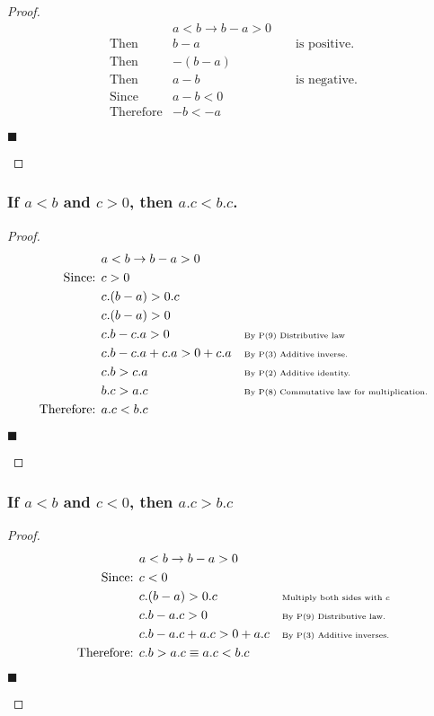 \documentclass[letterpaper, 10 pt, conference]{ieeeconf}  %
\begin{document}
\begin{proof}
\begin{align}
    &a < b \rightarrow b - a > 0 &&\\
    \text{Then } &b - a &&\text{ is positive.} \\
    \text{Then } &-(b - a) &&\\
    \text{Then } &a - b&& \text{ is negative.} \\
    \text{Since } & a - b < 0 && \\
    \text{Therefore} & -b < -a &&
\end{align}
\begin{flushright}
$\blacksquare$
\end{flushright}
\end{proof}

\subsubsection{\textbf{If $a < b$ and $c > 0$, then $a.c < b.c$.}}
\begin{proof}
\begin{align}
    &a < b \rightarrow b - a > 0 &&\\
    \text{Since: } & c > 0 && \\
    & c.(b - a) > 0.c && \\
    & c.(b - a) > 0 && \\
    & c.b - c.a > 0 && \text{\tiny{By P(9) Distributive law}}\\
    & c.b - c.a + c.a > 0 + c.a && \text{\tiny{By P(3) Additive inverse.}}\\
    & c.b > c.a && \text{\tiny{By P(2) Additive identity.}}\\
    &b.c > a.c && \text{\tiny{By P(8) Commutative law for multiplication.}} \\
    \text{Therefore: } & a.c < b.c&&
\end{align}
\begin{flushright}
$\blacksquare$
\end{flushright}
\end{proof}

\subsubsection{\textbf{If $a < b$ and $c < 0$, then $a.c > b.c$}}

\begin{proof}
\begin{align}
    &a < b \rightarrow b - a > 0 &&\\
    \text{Since: } &c < 0 && \\
    & c.(b - a) > 0.c && \text{\tiny{Multiply both sides with $c$}} \\
    & c.b - a.c > 0 && \text{\tiny{By P(9) Distributive law.}}\\
    & c.b - a.c + a.c > 0 + a.c && \text{\tiny{By P(3) Additive inverses.}}\\
    \text{Therefore: }& c.b > a.c \equiv a.c < b.c &&
\end{align}
\begin{flushright}
$\blacksquare$
\end{flushright}
\end{proof}
\end{document}
